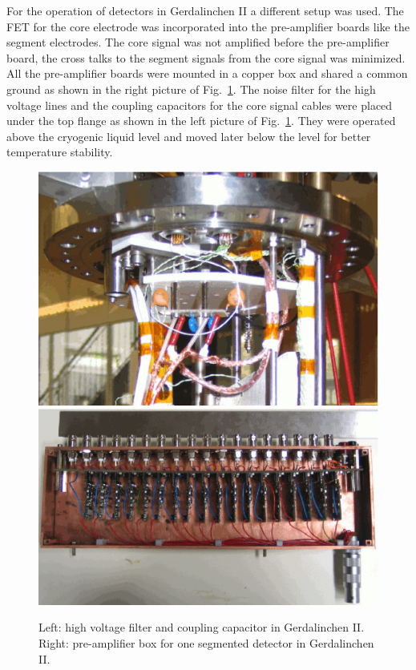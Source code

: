 For the operation of detectors in Gerdalinchen II a different setup was used. The FET for the core electrode was incorporated into the pre-amplifier boards like the segment electrodes. The core signal was not amplified before the pre-amplifier board, the cross talks to the segment signals from the core signal was minimized. All the pre-amplifier boards were mounted in a copper box and shared a common ground as shown in the right picture of Fig.~\ref{fig:tt:gef}. The noise filter for the high voltage lines and the coupling capacitors for the core signal cables were placed under the top flange as shown in the left picture of Fig.~\ref{fig:tt:gef}. They were operated above the cryogenic liquid level and moved later below the level for better temperature stability.
\begin{figure}[tbhp]
  \centering
  \includegraphics[height=0.2\textheight]{GIIHV}\hfil
  \includegraphics[height=0.2\textheight]{GIIpreamp}
  \caption{Left: high voltage filter and coupling capacitor in     Gerdalinchen II. Right: pre-amplifier box for one segmented     detector in Gerdalinchen II.}
  \label{fig:tt:gef}
\end{figure}

